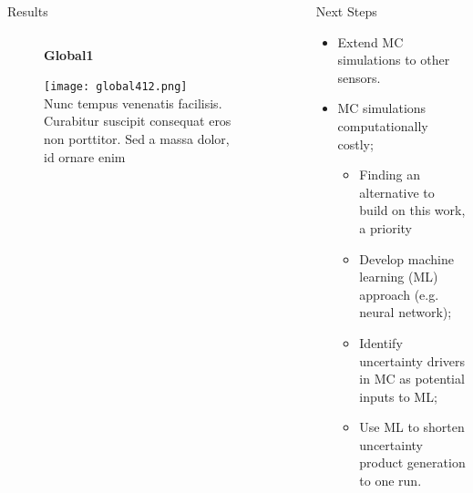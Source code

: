\documentclass[final]{beamer}
\newlength{\sepwid}
\newlength{\onecolwid}
\newlength{\twocolwid}
\begin{document}
\begin{frame}[t]
\begin{columns}[t]
\begin{column}{\twocolwid}
\begin{block}{Results}
\begin{columns}[t,totalwidth=\twocolwid]
\begin{column}{\onecolwid}
\end{column} %

\end{columns} %
\end{block}
\begin{figure}
\centering
\textbf{Global1}\par\medskip
\texttt{[image: global412.png]}
\\{Nunc tempus venenatis facilisis. Curabitur suscipit consequat eros non porttitor. Sed a massa dolor, id ornare enim}
\end{figure}

\begin{columns}[t,totalwidth=\twocolwid] %
\begin{column}{\onecolwid} %







\end{column} %

\end{columns} %

\end{column} %

\begin{column}{\sepwid}\end{column} %

\begin{column}{\onecolwid} %


\begin{block}{Next Steps}
\begin{itemize}
\item Extend MC simulations to other sensors.
\item MC simulations computationally costly;
	\begin{itemize}
	\item Finding an alternative to build on this work, a priority
	\item Develop machine learning (ML) approach (e.g. neural network);
	\item Identify uncertainty drivers in MC as potential inputs to ML;
 	\item Use ML to shorten uncertainty product generation to one run. 
	\end{itemize}
\end{itemize}


\end{block}
\end{column}
\end{columns}
\end{frame}
\end{document}
